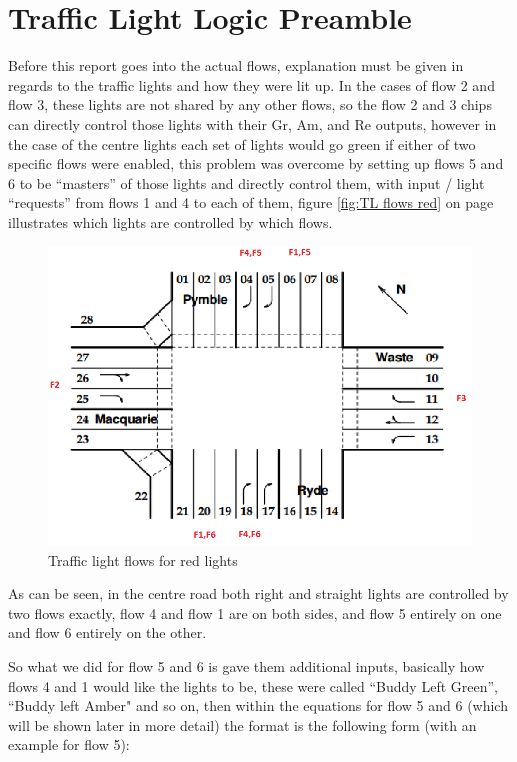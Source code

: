 \section{Traffic Light Logic Preamble}
Before this report goes into the actual flows, explanation must be given in
regards to the traffic lights and how they were lit up. In the cases of flow 2
and flow 3, these lights are not shared by any other flows, so the flow 2 and 3
chips can directly control those lights with their Gr, Am, and Re outputs,
however in the case of the centre lights each set of lights would go green if
either of two specific flows were enabled, this problem was overcome by setting
up flows 5 and 6 to be ``masters'' of those lights and directly control them, with
input / light ``requests'' from flows 1 and 4 to each of them, figure \ref{fig:TL
flows red} on page \pageref{fig:TL flows red} illustrates which lights are
controlled by which flows.
\begin{figure}
\includegraphics[width=\linewidth]{img/cXWehQ.png}
\caption{Traffic light flows for red lights}
\label{fig:TL flows red}
\end{figure}

As can be seen, in the centre road both right and straight lights are controlled
by two flows exactly, flow 4 and flow 1 are on both sides, and flow 5 entirely
on one and flow 6 entirely on the other.

So what we did for flow 5 and 6 is gave them additional inputs, basically how
flows 4 and 1 would like the lights to be, these were called ``Buddy Left
Green'', ``Buddy left Amber" and so on, then within the equations for flow 5 and
6 (which will be shown later in more detail) the format is the following form
(with an example for flow 5):

